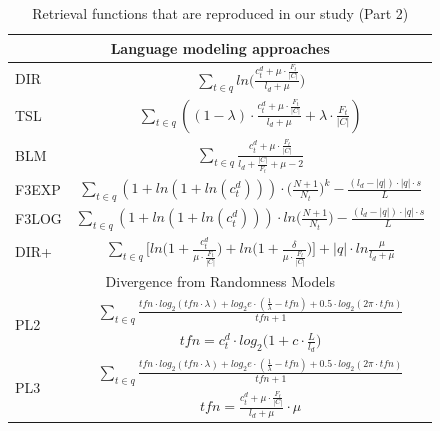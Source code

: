     \begin{table}[t]
    \caption{Retrieval functions that are reproduced in our study (Part 2)\label{tab:allmodels2}}
    \centering
    \begin{tabular}{ |l|c| }
     \hline
    \multicolumn{2}{|c|}{Language modeling approaches} \\ \hline 
    DIR & $
    \sum_{t \in q}{ln\Big(\frac{c_{t}^{d}+\mu \cdot \frac{F_t}{|C|}}{l_{d}+\mu}\Big)}
    $ \\ \hline

    TSL & $
    \sum_{t \in q}{((1-\lambda)\cdot \frac{c_{t}^{d}+\mu \cdot \frac{F_t}{|C|}}{l_{d}+\mu}+\lambda \cdot \frac{F_t}{|C|})}
    $ \\ \hline

    BLM & $
    \sum_{t \in q}{\frac{c_{t}^{d}+\mu \cdot \frac{F_t}{|C|}}{l_{d}+\frac{|C|}{F_t}+\mu-2} }
    $ \\ \hline

    F3EXP & $
    \sum_{t \in q}{(1+ln(1+ln(c_{t}^{d})))\cdot \Big(\frac{N+1}{N_t}\Big)^k} - \frac{(l_{d}-|q|)\cdot |q|\cdot s}{L}
    $ \\ \hline

    F3LOG & $
    \sum_{t \in q}{(1+ln(1+ln(c_{t}^{d})))\cdot ln\Big(\frac{N+1}{N_t}\Big)} - \frac{(l_{d}-|q|)\cdot |q|\cdot s}{L}
    $ \\ \hline

    DIR+ & $
    \sum_{t \in q} \Big[ln\Big(1+\frac{c_{t}^{d}}{\mu \cdot \frac{F_t}{|C|}}\Big)+ln\Big(1+\frac{\delta}{\mu \cdot \frac{F_t}{|C|}}\Big)\Big] +|q|\cdot ln\frac{\mu}{l_{d}+\mu}
    $ \\ \hline
         \hline

    \multicolumn{2}{|c|}{Divergence from Randomness Models} \\ \hline
    \multirow{2}{*}{PL2} & $
    \sum_{t \in q}{\frac{tfn\cdot log_2(tfn \cdot \lambda)+log_2e\cdot (\frac{1}{\lambda}-tfn)+0.5\cdot log_2(2\pi\cdot tfn)}{tfn+1} }
    $ \\ 
    & $
    tfn = c_{t}^{d}\cdot log_2\Big(1+c\cdot \frac{L}{l_{d}}\Big)
    $ \\ \hline

    \multirow{2}{*}{PL3} & $
    \sum_{t \in q}{\frac{tfn\cdot log_2(tfn \cdot \lambda)+log_2e\cdot (\frac{1}{\lambda}-tfn)+0.5\cdot log_2(2\pi\cdot tfn)}{tfn+1} }
    $ \\ 
    & $
    tfn = \frac{c_{t}^{d}+\mu \cdot \frac{F_t}{|C|}}{l_{d}+\mu}\cdot \mu
    $ \\ \hline


\end{tabular}
\end{table}
